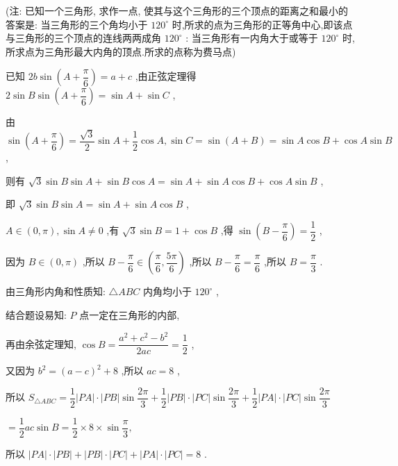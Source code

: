 \begin{enumerate}
\begin{enumerate}
        (注: 已知一个三角形, 求作一点, 使其与这个三角形的三个顶点的距离之和最小的答案是: 当三角形的三个角均小于 ${120}^{ \circ  }$ 时,所求的点为三角形的正等角中心,即该点与三角形的三个顶点的连线两两成角 ${120}^{ \circ  }$ : 当三角形有一内角大于或等于 ${120}^{ \circ  }$ 时,所求点为三角形最大内角的顶点.所求的点称为费马点)
        \begin{jieda}
            已知 ${2b}\sin \left( {A + \dfrac{\pi }{6}}\right)  = a + c$ ,由正弦定理得 $2\sin B\sin \left( {A + \dfrac{\pi }{6}}\right)  = \sin A + \sin C$ ,
            
            由 $\sin \left( {A + \dfrac{\pi }{6}}\right)  = \dfrac{\sqrt{3}}{2}\sin A + \dfrac{1}{2}\cos A,\sin C = \sin \left( {A + B}\right)  = \sin A\cos B + \cos A\sin B$ ,
            
            则有 $\sqrt{3}\sin B\sin A + \sin B\cos A = \sin A + \sin A\cos B + \cos A\sin B$ ,
            
            即 $\sqrt{3}\sin B\sin A = \sin A + \sin A\cos B$ ,
            
            $A \in  \left( {0,\pi }\right) ,\sin A \neq  0$ ,有 $\sqrt{3}\sin B = 1 + \cos B$ ,得 $\sin \left( {B - \dfrac{\pi }{6}}\right)  = \dfrac{1}{2}$ ,
            
            因为 $B \in  \left( {0,\pi }\right)$ ,所以 $B - \dfrac{\pi }{6} \in  \left( {\dfrac{\pi }{6},\dfrac{5\pi }{6}}\right)$ ,所以 $B - \dfrac{\pi }{6} = \dfrac{\pi }{6}$ ,所以 $B = \dfrac{\pi }{3}$ .
            
            由三角形内角和性质知: $\bigtriangleup {ABC}$ 内角均小于 ${120}^{ \circ  }$ ,
            
            结合题设易知: $P$ 点一定在三角形的内部,
            
            再由余弦定理知, $\cos B = \dfrac{{a}^{2} + {c}^{2} - {b}^{2}}{2ac} = \dfrac{1}{2}$ ,
            
            又因为 ${b}^{2} = {\left( a - c\right) }^{2} + 8$ ,所以 ${ac} = 8$ ,
            
            所以 ${S}_{\bigtriangleup {ABC}} = \dfrac{1}{2}\left| {PA}\right|  \cdot  \left| {PB}\right| \sin \dfrac{2\pi }{3} + \dfrac{1}{2}\left| {PB}\right|  \cdot  \left| {PC}\right| \sin \dfrac{2\pi }{3} + \dfrac{1}{2}\left| {PA}\right|  \cdot  \left| {PC}\right| \sin \dfrac{2\pi }{3}$
            
            $= \dfrac{1}{2}{ac}\sin B = \dfrac{1}{2} \times  8 \times  \sin \dfrac{\pi }{3},$
            
            所以 $\left| {PA}\right|  \cdot  \left| {PB}\right|  + \left| {PB}\right|  \cdot  \left| {PC}\right|  + \left| {PA}\right|  \cdot  \left| {PC}\right|  = 8$ .
            

\end{jieda}
\end{enumerate}
\end{enumerate}
